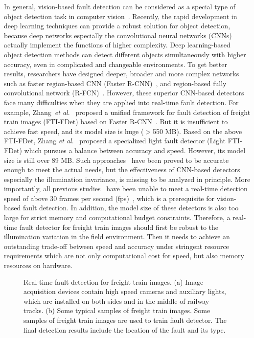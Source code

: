 In general, vision-based fault detection can be considered as a special type of object detection task in computer vision~\cite{8911418}. Recently, the rapid development in deep learning techniques can provide a robust solution for object detection, because deep networks especially the convolutional neural networks (CNNs) actually implement the functions of higher complexity. Deep learning-based object detection methods can detect different objects simultaneously with higher accuracy, even in complicated and changeable environments. To get better results, researchers have designed deeper, broader and more complex networks such as faster region-based CNN (Faster R-CNN)~\cite{RenHGS15}, and region-based fully convolutional network (R-FCN)~\cite{DaiLHS16}. However, these superior CNN-based detectors face many difficulties when they are applied into real-time fault detection. For example, Zhang~\emph{et al}.~\cite{zhang2018} proposed a unified framework for fault detection of freight train images (FTI-FDet) based on Faster R-CNN~\cite{RenHGS15}. But it is insufficient to achieve fast speed, and its model size is huge ($>$550 MB). Based on the above FTI-FDet, Zhang \emph{et al}.~\cite{8911418} proposed a specialized light fault detector (Light FTI-FDet) which pursues a balance between accuracy and speed. However, its model size is still over 89 MB. Such approaches~\cite{zhang2018,8911418} have been proved to be accurate enough to meet the actual needs, but the effectiveness of CNN-based detectors especially the illumination invariance, is missing to be analyzed in principle. More importantly, all previous studies~\cite{Sun2017Automatic,zhang2018,8911418,RenHGS15,DaiLHS16} have been unable to meet a real-time detection speed of above 30 frames per second (fps)~\cite{Gaussian-YOLOv3}, which is a prerequisite for vision-based fault detection. In addition, the model size of these detectors is also too large for strict memory and computational budget constraints. Therefore, a real-time fault detector for freight train images should first be robust to the illumination variation in the field environment. Then it needs to achieve an outstanding trade-off between speed and accuracy under stringent resource requirements which are not only computational cost for speed, but also memory resources on hardware.

\begin{figure*}[!t]
 \centering
 \hspace{1em}
 \caption{Real-time fault detection for freight train images. (a) Image acquisition devices contain high speed cameras and auxiliary lights, which are installed on both sides and in the middle of railway tracks. (b) Some typical samples of freight train images. Some samples of freight train images are used to train fault detector. The final detection results include the location of the fault and its type.}
 \label{fig:detection}
\end{figure*}

